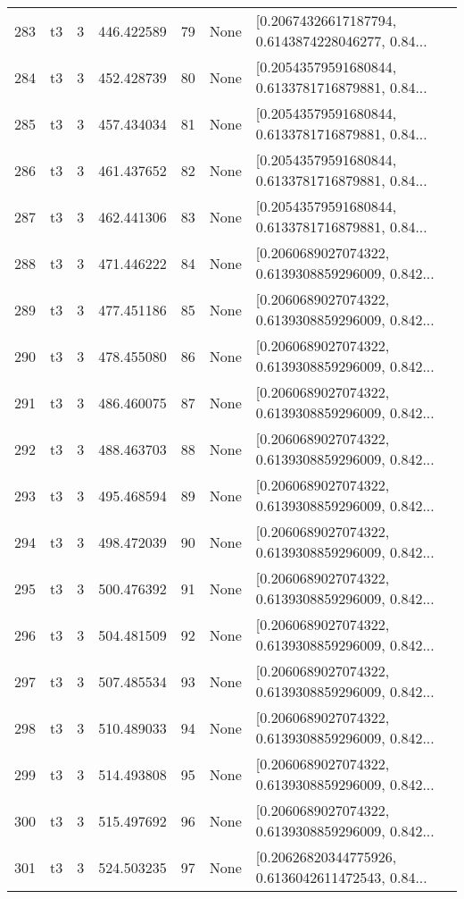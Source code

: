 \begin{tabular}{lllrlll}
283 &  t3 &   3 &  446.422589 &   79 &  None &  [0.20674326617187794, 0.6143874228046277, 0.84... \\
284 &  t3 &   3 &  452.428739 &   80 &  None &  [0.20543579591680844, 0.6133781716879881, 0.84... \\
285 &  t3 &   3 &  457.434034 &   81 &  None &  [0.20543579591680844, 0.6133781716879881, 0.84... \\
286 &  t3 &   3 &  461.437652 &   82 &  None &  [0.20543579591680844, 0.6133781716879881, 0.84... \\
287 &  t3 &   3 &  462.441306 &   83 &  None &  [0.20543579591680844, 0.6133781716879881, 0.84... \\
288 &  t3 &   3 &  471.446222 &   84 &  None &  [0.2060689027074322, 0.6139308859296009, 0.842... \\
289 &  t3 &   3 &  477.451186 &   85 &  None &  [0.2060689027074322, 0.6139308859296009, 0.842... \\
290 &  t3 &   3 &  478.455080 &   86 &  None &  [0.2060689027074322, 0.6139308859296009, 0.842... \\
291 &  t3 &   3 &  486.460075 &   87 &  None &  [0.2060689027074322, 0.6139308859296009, 0.842... \\
292 &  t3 &   3 &  488.463703 &   88 &  None &  [0.2060689027074322, 0.6139308859296009, 0.842... \\
293 &  t3 &   3 &  495.468594 &   89 &  None &  [0.2060689027074322, 0.6139308859296009, 0.842... \\
294 &  t3 &   3 &  498.472039 &   90 &  None &  [0.2060689027074322, 0.6139308859296009, 0.842... \\
295 &  t3 &   3 &  500.476392 &   91 &  None &  [0.2060689027074322, 0.6139308859296009, 0.842... \\
296 &  t3 &   3 &  504.481509 &   92 &  None &  [0.2060689027074322, 0.6139308859296009, 0.842... \\
297 &  t3 &   3 &  507.485534 &   93 &  None &  [0.2060689027074322, 0.6139308859296009, 0.842... \\
298 &  t3 &   3 &  510.489033 &   94 &  None &  [0.2060689027074322, 0.6139308859296009, 0.842... \\
299 &  t3 &   3 &  514.493808 &   95 &  None &  [0.2060689027074322, 0.6139308859296009, 0.842... \\
300 &  t3 &   3 &  515.497692 &   96 &  None &  [0.2060689027074322, 0.6139308859296009, 0.842... \\
301 &  t3 &   3 &  524.503235 &   97 &  None &  [0.20626820344775926, 0.6136042611472543, 0.84... \\

\end{tabular}
